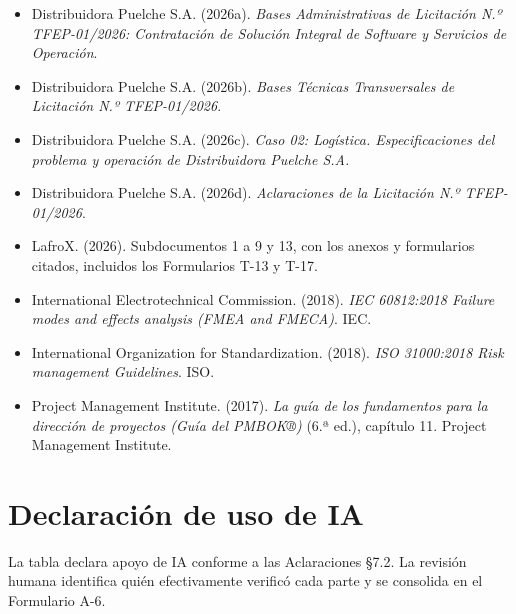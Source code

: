 \begin{itemize}[leftmargin=*,itemsep=3pt]
\item Distribuidora Puelche S.A. (2026a). \emph{Bases Administrativas de Licitación N.º TFEP-01/2026: Contratación de Solución Integral de Software y Servicios de Operación}.
\item Distribuidora Puelche S.A. (2026b). \emph{Bases Técnicas Transversales de Licitación N.º TFEP-01/2026}.
\item Distribuidora Puelche S.A. (2026c). \emph{Caso 02: Logística. Especificaciones del problema y operación de Distribuidora Puelche S.A.}
\item Distribuidora Puelche S.A. (2026d). \emph{Aclaraciones de la Licitación N.º TFEP-01/2026}.
\item LafroX. (2026). Subdocumentos 1 a 9 y 13, con los anexos y formularios citados, incluidos los Formularios T-13 y T-17.
\item International Electrotechnical Commission. (2018). \emph{IEC 60812:2018 Failure modes and effects analysis (FMEA and FMECA)}. IEC.
\item International Organization for Standardization. (2018). \emph{ISO 31000:2018 Risk management \textemdash{} Guidelines}. ISO.
\item Project Management Institute. (2017). \emph{La guía de los fundamentos para la dirección de proyectos (Guía del PMBOK®)} (6.ª ed.), capítulo 11. Project Management Institute.
\end{itemize}

\clearpage
\section*{Declaración de uso de IA}

La tabla declara apoyo de IA conforme a las Aclaraciones §7.2. La revisión humana identifica quién efectivamente verificó cada parte y se consolida en el Formulario A-6.

